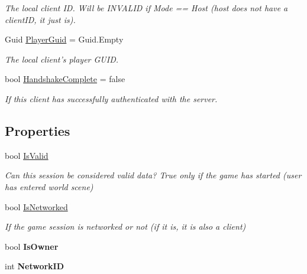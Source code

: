\begin{DoxyCompactItemize}
\begin{DoxyCompactList}\small\item\em The local client I\-D. Will be I\-N\-V\-A\-L\-I\-D if Mode == Host (host does not have a client\-I\-D, it just is). \end{DoxyCompactList}\item 
Guid \hyperlink{class_skyrates_1_1_common_1_1_network_1_1_session_a2c3090338ac56475b1a536db879e8ddf}{Player\-Guid} = Guid.\-Empty
\begin{DoxyCompactList}\small\item\em The local client's player G\-U\-I\-D. \end{DoxyCompactList}\item 
bool \hyperlink{class_skyrates_1_1_common_1_1_network_1_1_session_aa819705fe7a825f718a25cf932471a47}{Handshake\-Complete} = false
\begin{DoxyCompactList}\small\item\em If this client has successfully authenticated with the server. \end{DoxyCompactList}\end{DoxyCompactItemize}
\subsection*{Properties}
\begin{DoxyCompactItemize}
\item 
bool \hyperlink{class_skyrates_1_1_common_1_1_network_1_1_session_a73011cb9fda86ee41cf5964989d1b9c2}{Is\-Valid}
\begin{DoxyCompactList}\small\item\em Can this session be considered valid data? True only if the game has started (user has entered world scene) \end{DoxyCompactList}\item 
bool \hyperlink{class_skyrates_1_1_common_1_1_network_1_1_session_a9502bbd3da8fd21ef48dd05afd2e3743}{Is\-Networked}
\begin{DoxyCompactList}\small\item\em If the game session is networked or not (if it is, it is also a client) \end{DoxyCompactList}\item 
\hypertarget{class_skyrates_1_1_common_1_1_network_1_1_session_a207a8acade7599cf44c03735c2604938}{bool {\bfseries Is\-Owner}}\label{class_skyrates_1_1_common_1_1_network_1_1_session_a207a8acade7599cf44c03735c2604938}

\item 
\hypertarget{class_skyrates_1_1_common_1_1_network_1_1_session_ab543841394906d3be36e93be1de1413c}{int {\bfseries Network\-I\-D}}\label{class_skyrates_1_1_common_1_1_network_1_1_session_ab543841394906d3be36e93be1de1413c}

\end{DoxyCompactItemize}


